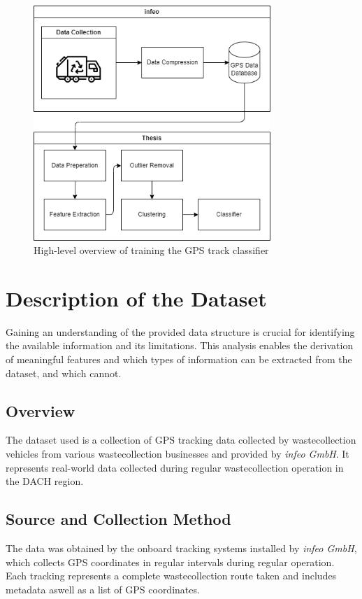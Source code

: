 \documentclass[a4paper,12pt,twoside]{scrreprt}
\begin{document}
\begin{figure}[htbp]
  \centering

  \includegraphics[width=0.8\textwidth]{Diagrams/drawio/big_picture.png}
  \caption{High-level overview of training the GPS track classifier}
  \label{fig:big_picture_diagram}
\end{figure}
\FloatBarrier

\section{Description of the Dataset}
Gaining an understanding of the provided data structure is crucial for
identifying the available information and its limitations.
This analysis enables the derivation of meaningful features and which types of
information can be extracted from the dataset, and which cannot.

\subsection{Overview}
The dataset used is a collection of GPS tracking data collected by
wastecollection vehicles from various wastecollection businesses and provided
by \textit{infeo GmbH}. It represents real-world data
collected during regular wastecollection operation in the DACH region.

\subsection{Source and Collection Method}
The data was obtained by the onboard tracking systems installed by
\textit{infeo GmbH},
which collects GPS coordinates in regular intervals during regular operation.
Each tracking represents a complete wastecollection route taken and includes
metadata aswell as a list of GPS coordinates.
\end{document}
